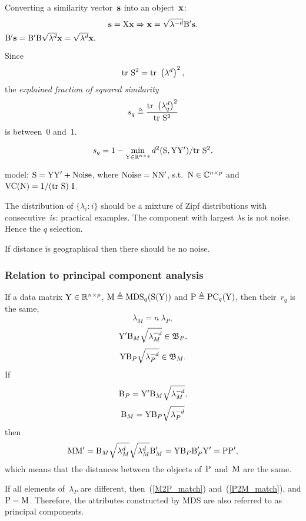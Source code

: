 \documentclass[10pt,a4paper]{article}
\theoremstyle{plain} \newtheorem{Lem}{Lemma}
\begin{document}
Converting a similarity vector~$\mathbf s$ into an object~$\mathbf x$:
$$ \mathbf s = \mathrm X \mathbf x \Rightarrow \mathbf x = \sqrt{\mathbf \lambda^{-d}} \mathrm B' \mathbf s. $$
\proof
{
$\mathrm B' \mathbf s = \mathrm B' \mathrm B \sqrt{\mathbf \lambda^d} \mathbf x = \sqrt{\mathbf \lambda^d} \mathbf x.$
}


Since
$$ \mathrm {tr} \  \mathrm S^2 = \mathrm {tr} \  \left(\mathbf \lambda^d \right)^2, $$
the {\em explained fraction of squared similarity}
$$ s_q \triangleq \frac {\mathrm {tr} \  \left(\mathbf \lambda^d_q \right)^2} {\mathrm {tr} \  \mathrm S^2} $$
is between~0 and~1.

$$ s_q = 1 - \min_{\mathrm Y \in \mathbb R^{n \times q}} d^2(\mathrm S, \mathrm Y \mathrm Y') / \mathrm {tr} \  \mathrm S^2. $$

\comm
{model: $\mathrm S = \mathrm Y \mathrm Y' + \mathrm {Noise}$, where $\mathrm{Noise} = \mathrm N \mathrm N'$, s.t.~$\mathrm N \in \mathbb C^{n \times p}$ and $\mathrm {VC}(\mathrm N) = 1 / (\mathrm {tr} \  \mathrm S) \ \mathrm I$.

The distribution of $\{\lambda_i : i\}$ should be a mixture of Zipf distributions with consecutive~$i$s: practical examples.
The component with largest $\lambda$s is not noise.
Hence the $q$ selection.

If distance is geographical then there should be no noise.
}


\subsubsection{Relation to principal component analysis}

If a data matrix $\mathrm Y \in \mathbb R^{n \times p}$, $\mathrm M \triangleq \mathrm {MDS}_q(\mathrm S(\mathrm Y))$ and $\mathrm P \triangleq \mathrm {PC}_q(\mathrm Y)$,
then their~$r_q$ is the same,
$$ \lambda_M = n \ \lambda_P, $$
$$ \mathrm Y' \mathrm B_M \sqrt{\lambda_M^{-d}} \in \mathfrak B_P, $$
$$ \mathrm Y  \mathrm B_P \sqrt{\lambda_P^{-d}} \in \mathfrak B_M. $$
If
\begin{equation} \label{M2P_match}
  \mathrm B_P = \mathrm Y' \mathrm B_M \sqrt{\lambda_M^{-d}},
\end{equation}
\begin{equation} \label{P2M_match}
  \mathrm B_M = \mathrm Y  \mathrm B_P \sqrt{\lambda_P^{-d}}
\end{equation}
then
$$ \mathrm M \mathrm M' = \mathrm B_M \sqrt {\lambda_M^d} \sqrt {\lambda_M^d} \mathrm B_M'  = \mathrm Y \mathrm B_P \mathrm B_P' \mathrm Y' = \mathrm P \mathrm P', $$
which means that the distances between the objects of~$\mathrm P$ and~$\mathrm M$ are the same.

If all elements of~$\lambda_P$ are different, then~(\ref{M2P_match}) and~({\ref{P2M_match}}), and $\mathrm P = \mathrm M$.
Therefore, the attributes constructed by MDS are also referred to as principal components.
\end{document}
